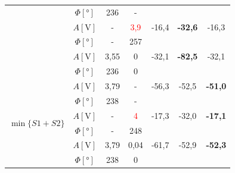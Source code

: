 \documentclass[polish,a4paper,11pt]{mwart}
\begin{document}
\begin{table}[!tbh]
\begin{tabular}{|c|c|c|c|c|c|c|}
				       &$\Phi [\si{\degree}]$ & 236 & - & \multicolumn{3}{c}{}\\\cline{2-7}
				       &   $A [\si{\V}]$ & - & \textcolor{red}{3,9} & -16,4 & \textbf{-32,6} & -16,3 \\\cline{2-7}
				       &$\Phi [\si{\degree}]$ & - & 257 & \multicolumn{3}{c}{}\\\cline{2-7}
				       &   $A [\si{\V}]$ & 3,55 & 0 & -32,1 & \textbf{-82,5} & -32,1\\\cline{2-7}
				       &$\Phi [\si{\degree}]$ & 236 & 0 & \multicolumn{3}{c}{}\\\hline
    \multirow{6}{*}{$\min\{S1+S2\}$}   &   $A [\si{\V}]$ & 3,79 & - & -56,3 & -52,5 & \textbf{-51,0}\\\cline{2-7}
				       &$\Phi [\si{\degree}]$ & 238 & - & \multicolumn{3}{c}{}\\\cline{2-7}
				       &   $A [\si{\V}]$ & - & \textcolor{red}{4} & -17,3 & -32,0 & \textbf{-17,1} \\\cline{2-7}
				       &$\Phi [\si{\degree}]$ & - & 248 & \multicolumn{3}{c}{}\\\cline{2-7}
				       &   $A [\si{\V}]$ & 3,79 & 0,04 & -61,7 & -52,9 & \textbf{-52,3} \\\cline{2-7}
				       &$\Phi [\si{\degree}]$ & 238 & 0 & \multicolumn{3}{c}{}\\\cline{1-4}
  \end{tabular}
\end{table}
\end{document}
